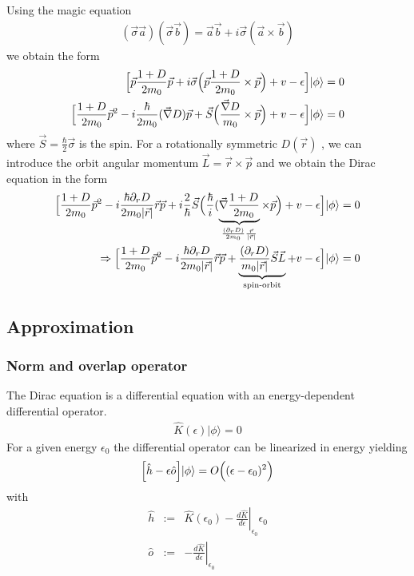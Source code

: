 \documentclass[11pt,a4paper]{report}
\begin{document}
Using the magic equation
\begin{eqnarray}
(\vec{\sigma}\vec{a})(\vec{\sigma}\vec{b})
=\vec{a}\vec{b}+i\vec{\sigma}(\vec{a}\times\vec{b})
\end{eqnarray}
we obtain the form
\begin{eqnarray}
\Bigl[\vec{p} \frac{1+D}{2m_0}\vec{p} 
+i\vec{\sigma} 
\Bigl(\vec{p} \frac{1+D}{2m_0}\times\vec{p} \Bigr)
+v-\epsilon\Bigr]|\phi\rangle=0
\nonumber\\
\Bigl[\frac{1+D}{2m_0}\vec{p}^2-i\frac{\hbar}{2m_0}(\vec{\nabla}D)\vec{p}
+\vec{S}\Bigl(\frac{\vec{\nabla}D}{m_0}\times\vec{p} \Bigr)
+v-\epsilon\Bigr]|\phi\rangle=0
\end{eqnarray}
where $\vec{S}=\frac{\hbar}{2}\vec{\sigma}$ is the spin.  For a
rotationally symmetric $D(\vec{r})$ , we can
introduce the orbit angular momentum $\vec{L}=\vec{r}\times\vec{p}$
and we obtain the Dirac equation in the form
\begin{eqnarray}
\Bigl[
\frac{1+D}{2m_0}\vec{p}^2 
-i\frac{\hbar\partial_rD}{2m_0|\vec{r}|}\vec{r}\vec{p} 
+i\frac{2}{\hbar}\vec{S} 
\Bigl(\frac{\hbar}{i}(\underbrace{\vec{\nabla}\frac{1+D}{2m_0}}
_{\frac{(\partial_r D)}{2m_0}\frac{\vec{r}}{|\vec{r}|}}\times\vec{p} \Bigr)
+v-\epsilon\Bigr]|\phi\rangle=0
\nonumber\\
\Rightarrow\Bigl[
\frac{1+D}{2m_0}\vec{p}^2 
-i\frac{\hbar\partial_rD}{2m_0|\vec{r}|}\vec{r}\vec{p} 
+ \underbrace{\frac{(\partial_r D)}{m_0|\vec{r}|}\vec{S}\vec{L}}_{\text{spin-orbit}}
+v-\epsilon\Bigr]|\phi\rangle=0
\nonumber\\
\end{eqnarray}


\subsection{Approximation}
\subsubsection{Norm and overlap operator}
The Dirac equation is a differential equation with an energy-dependent
differential operator. 
\begin{eqnarray}
\hat{K}(\epsilon)|\phi\rangle=0
\end{eqnarray}
For a given energy $\epsilon_0$ the differential operator can be
linearized in energy yielding
\begin{eqnarray}
\Bigl[\hat{h}-\epsilon\hat{o}\Bigr]|\phi\rangle
=O\Bigr((\epsilon-\epsilon_0)^2\Bigr)
\end{eqnarray}
with
\begin{eqnarray}
\hat{h}&:=& \hat{K}(\epsilon_0)
-\left.\frac{d\hat{K}}{d\epsilon}\right|_{\epsilon_0}\epsilon_0
\nonumber\\
\hat{o}&:=& -\left.\frac{d\hat{K}}{d\epsilon}\right|_{\epsilon_0}
\end{eqnarray}
\end{document}
